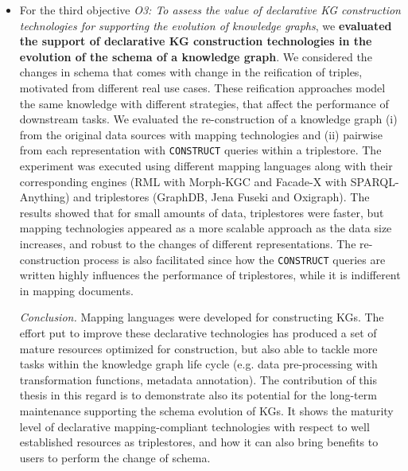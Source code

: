 \begin{itemize}
    \item For the third objective \textit{O3: To assess the value of declarative KG construction technologies for supporting the evolution of knowledge graphs}, we \textbf{evaluated the support of declarative KG construction technologies in the evolution of the schema of a knowledge graph}. We considered the changes in schema that comes with change in the reification of triples, motivated from different real use cases. These reification approaches model the same knowledge with different strategies, that affect the performance of downstream tasks. We evaluated the re-construction of a knowledge graph (i) from the original data sources with mapping technologies and (ii) pairwise from each representation with \texttt{CONSTRUCT} queries within a triplestore. The experiment was executed using different mapping languages along with their corresponding engines (RML with Morph-KGC and Facade-X with SPARQL-Anything) and triplestores (GraphDB, Jena Fuseki and Oxigraph). The results showed that for small amounts of data, triplestores were faster, but mapping technologies appeared as a more scalable approach as the data size increases, and robust to the changes of different representations. The re-construction process is also facilitated since how the \texttt{CONSTRUCT} queries are written highly influences the performance of triplestores, while it is indifferent in mapping documents. 

    \textit{Conclusion.} Mapping languages were developed for constructing KGs. The effort put  to improve these declarative technologies has produced a set of mature resources optimized for construction, but also able to tackle more tasks within the knowledge graph life cycle (e.g. data pre-processing with transformation functions, metadata annotation). The contribution of this thesis in this regard is to demonstrate also its potential for the long-term maintenance supporting the schema evolution of KGs. It shows the maturity level of declarative mapping-compliant technologies with respect to well established resources as triplestores, and how it can also bring benefits to users to perform the change of schema. 
\end{itemize}

